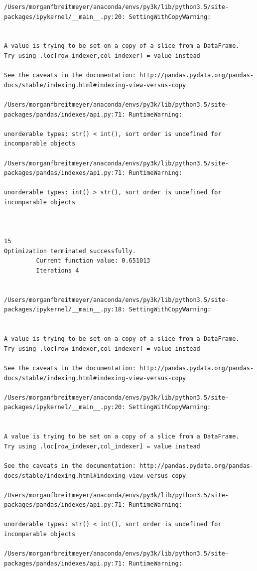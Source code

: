 \begin{lstlisting}
/Users/morganfbreitmeyer/anaconda/envs/py3k/lib/python3.5/site-packages/ipykernel/__main__.py:20: SettingWithCopyWarning:


A value is trying to be set on a copy of a slice from a DataFrame.
Try using .loc[row_indexer,col_indexer] = value instead

See the caveats in the documentation: http://pandas.pydata.org/pandas-docs/stable/indexing.html#indexing-view-versus-copy

/Users/morganfbreitmeyer/anaconda/envs/py3k/lib/python3.5/site-packages/pandas/indexes/api.py:71: RuntimeWarning:

unorderable types: str() < int(), sort order is undefined for incomparable objects

/Users/morganfbreitmeyer/anaconda/envs/py3k/lib/python3.5/site-packages/pandas/indexes/api.py:71: RuntimeWarning:

unorderable types: int() > str(), sort order is undefined for incomparable objects



15
Optimization terminated successfully.
         Current function value: 0.651013
         Iterations 4


/Users/morganfbreitmeyer/anaconda/envs/py3k/lib/python3.5/site-packages/ipykernel/__main__.py:18: SettingWithCopyWarning:


A value is trying to be set on a copy of a slice from a DataFrame.
Try using .loc[row_indexer,col_indexer] = value instead

See the caveats in the documentation: http://pandas.pydata.org/pandas-docs/stable/indexing.html#indexing-view-versus-copy

/Users/morganfbreitmeyer/anaconda/envs/py3k/lib/python3.5/site-packages/ipykernel/__main__.py:20: SettingWithCopyWarning:


A value is trying to be set on a copy of a slice from a DataFrame.
Try using .loc[row_indexer,col_indexer] = value instead

See the caveats in the documentation: http://pandas.pydata.org/pandas-docs/stable/indexing.html#indexing-view-versus-copy

/Users/morganfbreitmeyer/anaconda/envs/py3k/lib/python3.5/site-packages/pandas/indexes/api.py:71: RuntimeWarning:

unorderable types: str() < int(), sort order is undefined for incomparable objects

/Users/morganfbreitmeyer/anaconda/envs/py3k/lib/python3.5/site-packages/pandas/indexes/api.py:71: RuntimeWarning:


\end{lstlisting}
